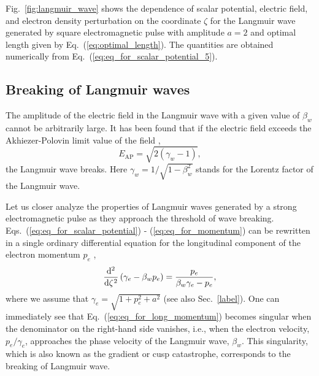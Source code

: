\documentclass[10pt, a4paper, twoside, openright]{report}
\begin{document}
Fig.~\ref{fig:langmuir_wave} shows the dependence of scalar potential, electric field, and electron density perturbation on the coordinate $ \zeta $ for the Langmuir wave generated by square electromagnetic pulse with amplitude $ a = 2 $ and optimal length given by Eq.~(\ref{eq:optimal_length}). The quantities are obtained numerically from Eq.~(\ref{eq:eq_for_scalar_potential_5}).

\subsection{Breaking of Langmuir waves}

The amplitude of the electric field in the Langmuir wave with a given value of $ \beta_w $ cannot be arbitrarily large. It has been found that if the electric field exceeds the Akhiezer-Polovin limit value of the field \cite{Akhiezer1956}, 
\begin{equation}\label{eq:akhiezer_polovin}
E_{\mathrm{AP}} = \sqrt{2 \left( \gamma_w - 1 \right)},
\end{equation}
the Langmuir wave breaks. Here $ \gamma_w = 1 / \sqrt{1 - \beta_w^2} $ stands for the Lorentz factor of the Langmuir wave. 

Let us closer analyze the properties of Langmuir waves generated by a strong electromagnetic pulse as they approach the threshold of wave breaking. Eqs.~(\ref{eq:eq_for_scalar_potential}) - (\ref{eq:eq_for_momentum}) can be rewritten in a single ordinary differential equation for the longitudinal component of the electron momentum $ p_e $ \cite{Panchenko2008, Bulanov2013},
\begin{equation}\label{eq:eq_for_long_momentum}
\diff*[2]{\left( \gamma_e - \beta_w p_e \right)}{\zeta} = \frac{p_e}{\beta_w \gamma_e - p_e},
\end{equation}
where we assume that $ \gamma_e = \sqrt{1 + p_e^2 + a^2} $ (see also Sec.~\ref{label}). One can immediately see that Eq.~(\ref{eq:eq_for_long_momentum}) becomes singular when the denominator on the right-hand side vanishes, i.e., when the electron velocity, $ p_e / \gamma_e $, approaches the phase velocity of the Langmuir wave, $ \beta_{w} $. This singularity, which is also known as the gradient or cusp catastrophe, corresponds to the breaking of Langmuir wave.
\end{document}
